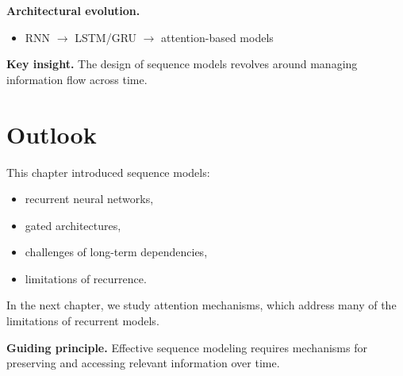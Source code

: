 \medskip

\noindent
\textbf{Architectural evolution.}
\begin{itemize}
    \item RNN $\rightarrow$ LSTM/GRU $\rightarrow$ attention-based models
\end{itemize}

\medskip

\noindent
\textbf{Key insight.}  
The design of sequence models revolves around managing information flow across time.

\section{Outlook}

This chapter introduced sequence models:
\begin{itemize}
    \item recurrent neural networks,
    \item gated architectures,
    \item challenges of long-term dependencies,
    \item limitations of recurrence.
\end{itemize}

\medskip

In the next chapter, we study attention mechanisms, which address many of the limitations of recurrent models.

\medskip

\noindent
\textbf{Guiding principle.}  
Effective sequence modeling requires mechanisms for preserving and accessing relevant information over time.